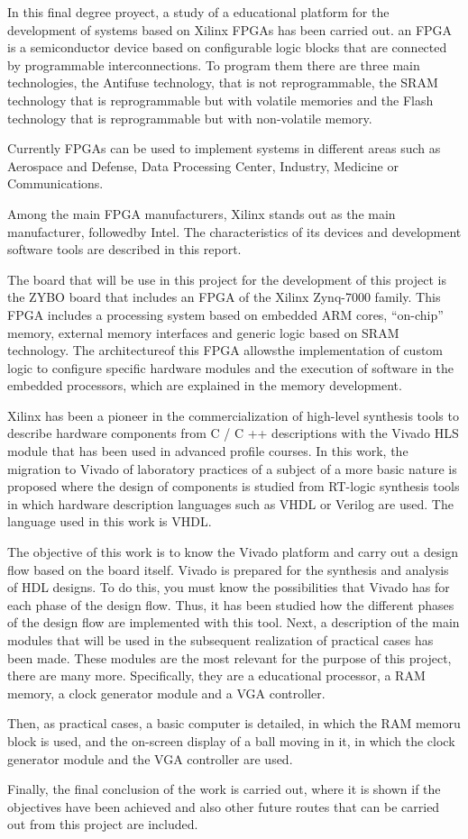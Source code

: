 In this final degree proyect, a study of a educational platform for the development of systems based on Xilinx FPGAs has been carried out. 
an FPGA is a semiconductor device based on configurable logic blocks that are connected by programmable interconnections. To program 
them there are three main technologies, the Antifuse technology, that is not reprogrammable, the SRAM technology that is reprogrammable but 
with volatile memories and the Flash technology that is reprogrammable but with non-volatile memory.

Currently FPGAs can be used to implement systems in different areas such as Aerospace and Defense, Data Processing Center, Industry, 
Medicine or Communications.

Among the main FPGA manufacturers, Xilinx stands out as the main manufacturer, followedby Intel. The characteristics of its devices and 
development software tools are described in this report.

The board that will be use in this project for the development of this project is the ZYBO board that includes an FPGA of the Xilinx 
Zynq-7000 family. This FPGA includes a processing system based on embedded ARM cores, ``on-chip'' memory, external memory interfaces and 
generic logic based on SRAM technology. The architectureof this FPGA allowsthe implementation of custom logic to configure specific hardware 
modules and the execution of software in the embedded processors, which are explained in the memory development.

Xilinx has been a pioneer in the commercialization of high-level synthesis tools to describe hardware components from C / C ++ descriptions with 
the Vivado HLS module that has been used in advanced profile courses. In this work, the migration to Vivado of laboratory practices of a subject of 
a more basic nature is proposed where the design of components is studied from RT-logic synthesis tools in which hardware description languages such 
as VHDL or Verilog are used. The language used in this work is VHDL.

The objective of this work is to know the Vivado platform and carry out a design flow based on the board itself. Vivado is prepared for the synthesis 
and analysis of HDL designs. To do this, you must know the possibilities that Vivado has for each phase of the design flow. Thus, it has been 
studied how the different phases of the design flow are implemented with this tool. Next, a description of the main modules that will be used 
in the subsequent realization of practical cases has been made. These modules are the most relevant for the purpose of this project, there are many more. 
Specifically, they are a educational processor, a RAM memory, a clock generator module and a VGA controller.

Then, as practical cases, a basic computer is detailed, in which the RAM memoru block is used, and the on-screen display of a ball moving in it, 
in which the clock generator module and the VGA controller are used.

Finally, the final conclusion of the work is carried out, where it is shown if the objectives have been achieved and also other future routes 
that can be carried out from this project are included.